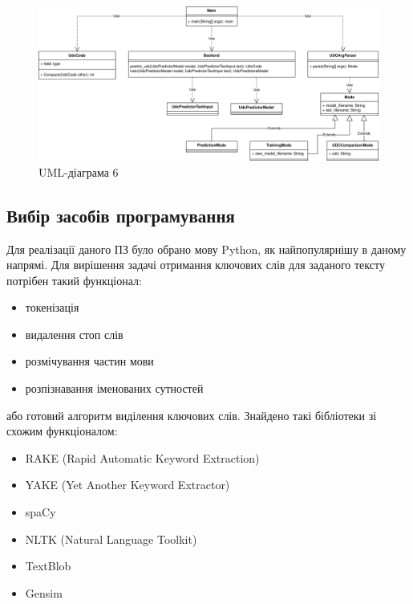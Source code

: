 \documentclass[14pt]{extarticle}
\begin{document}
  \begin{figure}
    \centering
    \includegraphics[height=0.45\textwidth]{io_uml6.drawio.png}    
    \caption{UML-діаграма 6}
    \label{fig:io_uml6}
  \end{figure}

  \newpage

  \subsection{Вибір засобів програмування}
  Для реалізації даного ПЗ було обрано мову Python,
  як найпопулярнішу в даному напрямі.
  Для вирішення задачі отримання ключових слів для заданого тексту
  потрібен такий функціонал:
  \begin{itemize}[labelindent=\dimexpr{}\relax, leftmargin=*]
    \item токенізація
    \item видалення стоп слів \cite{wiki_stop_word}
    \item розмічування частин мови \cite{wiki_pos_tagging}
    \item розпізнавання іменованих сутностей \cite{wiki_ner}
  \end{itemize}
  або готовий алгоритм виділення ключових слів.
  Знайдено такі бібліотеки зі схожим функціоналом:
  \begin{itemize}[labelindent=\dimexpr{}\relax, leftmargin=*]
    \item RAKE (Rapid Automatic Keyword Extraction) \cite{rake_nltk}
    \item YAKE (Yet Another Keyword Extractor) \cite{pypi_yake}
    \item spaCy \cite{spaCy}
    \item NLTK (Natural Language Toolkit) \cite{nltk}
    \item TextBlob \cite{TextBlob}
    \item Gensim \cite{gensim}
  \end{itemize}
\end{document}
